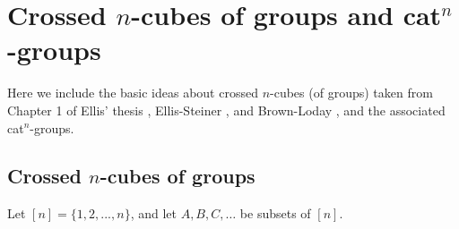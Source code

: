 

\section{Crossed $n$-cubes of groups and cat$^n$-groups}

\noindent
Here we include the basic ideas about crossed $n$-cubes (of groups)
taken from Chapter 1 of Ellis' thesis \cite{ellis-thesis},
Ellis-Steiner \cite{ell:st}, and Brown-Loday \cite{brow:lod}, 
and the associated cat$^n$-groups.


\subsection{Crossed $n$-cubes of groups}  

Let $[n] = \{1,2,...,n\}$, and let $A,B,C,\ldots$ be subsets of $[n]$.

